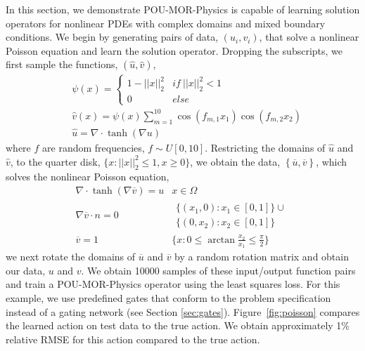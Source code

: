 In this section, we demonstrate POU-MOR-Physics is capable of learning solution operators for nonlinear PDEs with complex domains and mixed boundary conditions. We begin by generating pairs of data, $\left(u_i,v_i\right)$, that solve a nonlinear Poisson equation and learn the solution operator. Dropping the subscripts, we first  sample the functions, $\left(\hat{u},\hat{v}\right)$,
%
\begin{equation}
\begin{aligned}
    &\psi(x) = \left\{ \begin{matrix}1-||x||_2^2 & if\ ||x||_2^2<1\\
    0 & else\end{matrix} \right.\\
    &\hat{v}(x) = \psi(x)\sum_{m=1}^{10} \cos (f_{m,1} x_1) \cos (f_{m,2} x_2) \\
    &\hat{u} = \nabla \cdot \tanh(\nabla u)
\end{aligned}
\end{equation}
%
where $f$ are random frequencies, $f \sim U[0,10]$. Restricting the domains of $\hat{u}$ and $\hat{v}$, to the quarter disk, $\{x: ||x||_2^2\leq 1, x\geq 0\}$, we obtain the data, $\left\{\overline{u},\overline{v}\right\}$, which solves the nonlinear Poisson equation,
%
\begin{equation}
    \begin{matrix}
        \nabla \cdot \tanh(\nabla \overline{v}) = u & x\in \Omega\\
        \nabla \overline{v} \cdot n =0 & \begin{aligned}
            \{(x_1,0): x_1 \in [0,1]\} \cup \\\{(0,x_2): x_2 \in [0,1]\}
        \end{aligned} \\
        \overline{v} = 1 & \{ x: 0\leq\arctan \frac{x_2}{x_1}\leq\frac{\pi}{2}\}\
    \end{matrix}
\end{equation}
we next rotate the domains of $\overline{u}$ and $\overline{v}$ by a random rotation matrix and obtain our data, ${u}$ and ${v}$. We obtain 10000 samples of these input/output function pairs and train a POU-MOR-Physics operator using the least squares loss. For this example, we use predefined gates that conform to the problem specification instead of a gating network (see Section \ref{sec:gates}). Figure~\ref{fig:poisson} compares the learned action on test data to the true action. We obtain approximately 1\% relative RMSE for this action compared to the true action.

